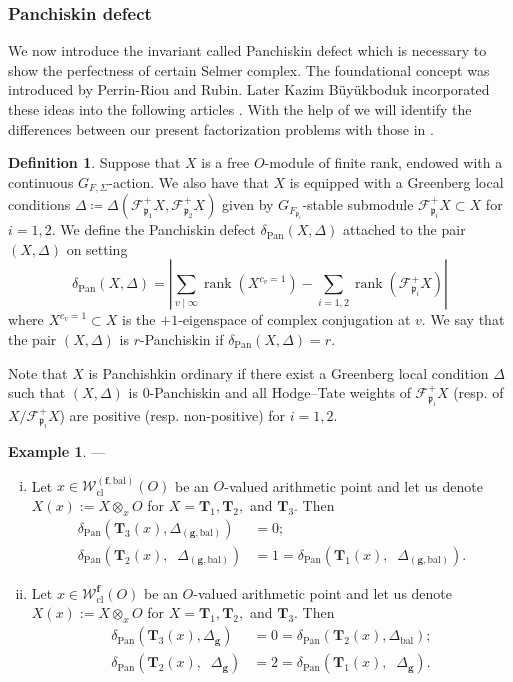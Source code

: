 \documentclass[10pt]{amsart}
\numberwithin{equation}{section}
\theoremstyle{definition}
\newtheorem{defn}[thm]{Definition}
\newtheorem{exmp}[thm]{Example}
\theoremstyle{remark} %
\newcommand{\mrm}{\mathrm}
\newcommand{\abs}[1]{\left\lvert#1\right\rvert}
\newcommand{\pan}{\mathrm{Pan}}
\DeclareMathOperator{\rank}{rank}
\DeclareMathOperator{\tr}{{tr}^*}
\renewcommand{\b}{\mathrm{bal}}
\newcommand{\f}{\mathbf{f}}
\newcommand{\scrF}{\mathscr{F}}
\newcommand{\g}{\mathbf{g}}
\newcommand{\G}{G_{F,\Sigma}}
\newcommand{\p}{\mathfrak{p}}
\newcommand{\T}{\mathbf{T}}
\newcommand{\W}{\mathcal{W}}
\begin{document}
	\subsubsection{Panchiskin defect}
	\label{sec_pan}
	We now introduce the invariant called Panchiskin defect which is necessary to show the perfectness of certain Selmer complex. The foundational concept was introduced by Perrin-Riou and Rubin. Later Kazim B\"{u}y\"{u}kboduk incorporated these ideas into the following articles \cite{kazim1,kazim2,kazim3,kazim4,kazim5,kazim6}. With the help of \cite[Section 7]{LZ20local} we will identify the differences between our present factorization problems with those in \cite{Greenberg1982, Palva18, BCS23}.
	\begin{defn}
		\label{panchiskin_defect}
		Suppose that $ X $ is a free $ O $-module of ﬁnite rank, endowed with a continuous $ \G $-action. We also have that $ X $ is equipped with a Greenberg local conditions $ \Delta \coloneqq \Delta(\scrF_{\p_1}^+X,\scrF_{\p_2}^+X) $ given by $ G_{F_{\p_i}} $-stable submodule $ \scrF_{\p_i}^+X \subset X $ for $ i=1,2$. We define the Panchiskin defect $ \delta_\pan(X,\Delta) $ attached to the pair $ (X, \Delta) $ on setting
		\[\delta_\pan(X,\Delta) = \abs{ \sum_{v \mid \infty}\rank(X^{c_v =1}) - \sum_{i=1,2}\rank(\scrF^+_{\p_i} X)} \]
		where $ X^{c_v =1} \subset X $ is the $ +1 $-eigenspace of complex conjugation at $ v $. We say that the pair $ (X, \Delta)$ is $ r $-Panchiskin if $ \delta_\pan(X,\Delta) = r $.
	\end{defn}
	Note that $ X $ is Panchishkin ordinary if there exist a Greenberg local condition $ \Delta $ such that $ (X,\Delta) $ is $ 0 $-Panchiskin and all Hodge–Tate weights of $ \scrF_{\p_i}^+X $ (resp. of $ X/\scrF_{\p_i}^+X $) are positive (resp. non-positive) for $ i =1,2 $.
	\begin{exmp}
		---
		\begin{enumerate}[(i)]
			\item Let $ x \in \W_{\mrm{cl}}^{(\f,\b)}(O) $ be an $ O $-valued arithmetic point and let us denote $X(x) := X \otimes_x O$ for $ X = \T_{1}, \T_{2}, $ and $ \T_{3} $. Then
			\begin{align*}
				\delta_\pan(\T_{3}(x), \Delta_{(\g, \b)}) &=0; \\
				\delta_\pan(\T_{2}(x), \tr\Delta_{(\g, \b)}) &=1 = \delta_\pan(\T_{1}(x), \tr\Delta_{(\g, \b)}).
			\end{align*}
			\item Let $ x \in \W_{\mrm{cl}}^{\f}(O) $ be an $ O $-valued arithmetic point and let us denote $X(x) := X \otimes_x O$ for $ X = \T_{1}, \T_{2}, $ and $ \T_{3} $. Then
			\begin{align*}
				\delta_\pan(\T_{3}(x), \Delta_{\g}) &=0= \delta_\pan(\T_{2}(x), \Delta_{\b}) ; \\
				\delta_\pan(\T_{2}(x), \tr\Delta_{\g}) &=2= \delta_\pan(\T_{1}(x), \tr\Delta_{\g}).
			\end{align*}
		\end{enumerate}
	\end{exmp}
\end{document}
